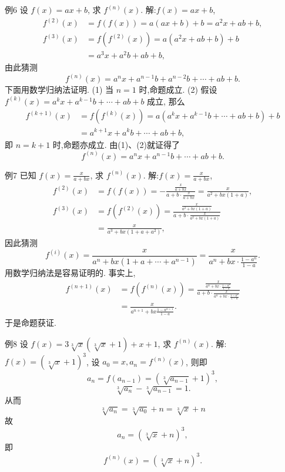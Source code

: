 例6 设 $f(x)=a x+b$, 求 $f^{(n)}(x)$.
解:$f(x)=a x+b$,
$$
\begin{aligned}
f^{(2)}(x) & =f(f(x))=a(a x+b)+b=a^2 x+a b+b, \\
f^{(3)}(x) & =f\left(f^{(2)}(x)\right)=a\left(a^2 x+a b+b\right)+b \\
& =a^3 x+a^2 b+a b+b,
\end{aligned}
$$
由此猜测
$$
f^{(n)}(x)=a^n x+a^{n-1} b+a^{n-2} b+\cdots+a b+b .
$$
下面用数学归纳法证明.
(1) 当 $n=1$ 时,命题成立.
(2) 假设 $f^{(k)}(x)=a^k x+a^{k-1} b+\cdots+a b+b$ 成立, 那么
$$
\begin{aligned}
f^{(k+1)}(x) & =f\left(f^{(k)}(x)\right)=a\left(a^k x+a^{k-1} b+\cdots+a b+b\right)+b \\
& =a^{k+1} x+a^k b+\cdots+a b+b,
\end{aligned}
$$
即 $n=k+1$ 时,命题亦成立.
由(1)、(2)就证得了
$$
f^{(n)}(x)=a^n x+a^{n-1} b+\cdots+a b+b .
$$



例7 已知 $f(x)=\frac{x}{a+b x}$, 求 $f^{(n)}(x)$.
解:$f(x)=\frac{x}{a+b x}$,
$$
\begin{aligned}
f^{(2)}(x) & =f(f(x))=-\frac{\frac{x}{a+b x}}{a+b \cdot \frac{x}{a+b x}}=\frac{x}{a^2+b x(1+a)}, \\
f^{(3)}(x) & =f\left(f^{(2)}(x)\right)=\frac{\frac{x}{a^2+b x(1+a)}}{a+b \cdot \frac{x}{a^2+b x(1+a)}} \\
& =\frac{x}{a^3+b x\left(1+a+a^2\right)},
\end{aligned}
$$
因此猜测
$$
f^{(i)}(x)=\frac{x}{a^n+b x\left(1+a+\cdots+a^{n-1}\right)}=\frac{x}{a^n+b x \cdot \frac{1-a^n}{1-a}} .
$$
用数学归纳法是容易证明的.
事实上,
$$
\begin{aligned}
f^{(n+1)}(x) & =f\left(f^{(n)}(x)\right)=\frac{\frac{x}{a^n+b x \cdot \frac{1-a^n}{1-a}}}{a+b \cdot \frac{x}{a^n+b x \cdot \frac{1-a^n}{1-a}}} \\
& =\frac{x}{a^{n+1}+b x \frac{1-a^{n+1}}{1-a}} .
\end{aligned}
$$
于是命题获证.



例8 设 $f(x)=3 \sqrt[3]{x}(\sqrt[3]{x}+1)+x+1$, 求 $f^{(n)}(x)$.
解:$f(x)=(\sqrt[3]{x}+1)^3$, 设 $a_0=x, a_n=f^{(n)}(x)$,
则即
$$
a_n=f\left(a_{n-1}\right)=\left(\sqrt[3]{a_{n-1}}+1\right)^3,
$$
$$
\sqrt[3]{a_n}-\sqrt[3]{a_{n-1}}=1 .
$$
从而
$$
\sqrt[3]{a_n}=\sqrt[3]{a_0}+n=\sqrt[3]{x}+n
$$
故
$$
a_n=(\sqrt[3]{x}+n)^3,
$$
即
$$
f^{(n)}(x)=(\sqrt[3]{x}+n)^3 .
$$



